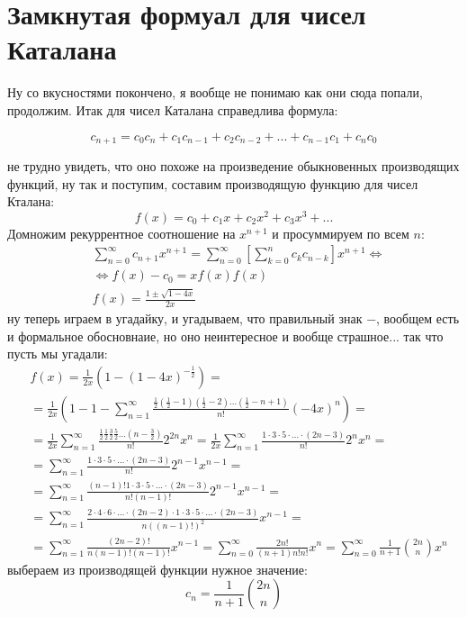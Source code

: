 \section{Замкнутая формуал для чисел Каталана}

Ну со вкусностями покончено, я вообще не понимаю как они сюда попали, продолжим. Итак для чисел Каталана справедлива формула:

\[
	c_{n+1} = c_0 c_{n} + c_1 c_{n-1} + c_2 c_{n-2} + ... + c_{n-1} c_1 + c_n c_0
\]

не трудно увидеть, что оно похоже на произведение обыкновенных производящих функций, ну так и поступим, составим производящую функцию для чисел Кталана:
\[
	f\left(x\right) = c_0 + c_1 x + c_2 x^2 + c_3 x^3 + ...
\]
Домножим рекуррентное соотношение на $x^{n+1}$ и просуммируем по всем $n$:
\[
	\begin{split}
		& \sum_{n=0}^{\infty} c_{n+1} x^{n+1} = \sum_{n=0}^{\infty} \left[\sum_{k=0}^{n} c_k c_{n-k}\right] x^{n+1} \Leftrightarrow \\
		& \Leftrightarrow f\left(x\right) - c_0 = x f\left(x\right) f\left(x\right) \\
		& f\left(x\right) = \frac{1 \pm \sqrt{1-4x}}{2x}
	\end{split}
\]
ну теперь играем в угадайку, и угадываем, что правильный знак $-$, вообщем есть и формальное обосновнаие, но оно неинтересное и вообще страшное... так что пусть мы угадали:
\[
	\begin{split}
		& f\left(x\right) = \frac{1}{2x} \left(1 - \left(1 - 4x\right)^{-\frac{1}{2}}\right) = \\
		& = \frac{1}{2x} \left(1 - 1 - \sum_{n=1}^{\infty} \frac{\frac{1}{2} \left(\frac{1}{2}-1\right)\left(\frac{1}{2}-2\right) ... \left(\frac{1}{2}-n+1\right)}{n!} \left(-4x\right)^n\right) = \\
		& = \frac{1}{2x} \sum_{n=1}^{\infty} \frac{\frac{1}{2} \frac{1}{2} \frac{3}{2} \frac{5}{2} ... \left(n-\frac{3}{2}\right)}{n!} 2^{2n} x^n = \frac{1}{2x}\sum_{n=1}^{\infty}\frac{1 \cdot 3 \cdot 5 \cdot ... \cdot \left(2n-3\right)}{n!} 2^n x^n = \\
		& = \sum_{n=1}^{\infty} \frac{1 \cdot 3 \cdot 5 \cdot ... \cdot \left(2n-3\right)}{n!} 2^{n-1} x^{n-1} = \\
		& = \sum_{n=1}^{\infty} \frac{\left(n-1\right)! 1 \cdot 3 \cdot 5 \cdot ... \cdot \left(2n-3\right)}{n!\left(n-1\right)!} 2^{n-1}x^{n-1} = \\
		& = \sum_{n=1}^{\infty} \frac{2 \cdot 4 \cdot 6 \cdot ... \cdot \left(2n-2\right) \cdot 1 \cdot 3 \cdot 5 \cdot ... \cdot \left(2n-3\right)}{n \left(\left(n-1\right)!\right)^2} x^{n-1} = \\
		& = \sum_{n=1}^{\infty} \frac{\left(2n-2\right)!}{n \left(n-1\right)! \left(n-1\right)!} x^{n-1} = \sum_{n=0}^{\infty} \frac{2n!}{\left(n+1\right) n! n!} x^n = \sum_{n=0}^{\infty} \frac{1}{n+1} \binom{2n}{n} x^n
	\end{split}
\]
выбераем из производящей функции нужное значение:
\[
	c_n = \frac{1}{n+1} \binom{2n}{n}
\]
